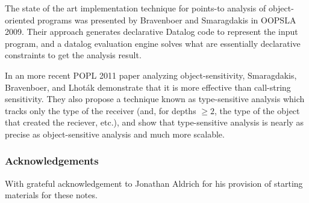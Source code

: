 \documentclass[11pt]{article}
\newcommand{\todo}[1]{}
\begin{document}
\begin{sloppypar}
The state of the art implementation technique for points-to analysis of object-oriented programs was presented by Bravenboer and Smaragdakis in OOPSLA 2009.  Their approach generates declarative Datalog code to represent the input program, and a datalog evaluation engine solves what are essentially declarative constraints to get the analysis result.

In an more recent POPL 2011 paper analyzing object-sensitivity, Smaragdakis, Bravenboer, and Lhot\'{a}k demonstrate that it is more effective than call-string sensitivity.  They also propose a technique known as type-sensitive analysis which tracks only the type of the receiver (and, for depths $\ge 2$, the type of the object that created the reciever, etc.), and show that type-sensitive analysis is nearly as precise as object-sensitive analysis and much more scalable.


\todo{fix formalism for m-CFA: coinductive!}


\end{sloppypar}

\subsubsection*{Acknowledgements}

With grateful acknowledgement to Jonathan Aldrich for his provision of starting
materials for these notes.
\end{document}

